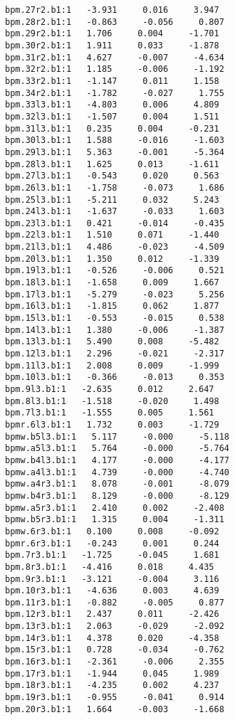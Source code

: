\begin{verbatim}
bpm.27r2.b1:1   -3.931     0.016     3.947
bpm.28r2.b1:1   -0.863     -0.056     0.807
bpm.29r2.b1:1   1.706     0.004     -1.701
bpm.30r2.b1:1   1.911     0.033     -1.878
bpm.31r2.b1:1   4.627     -0.007     -4.634
bpm.32r2.b1:1   1.185     -0.006     -1.192
bpm.33r2.b1:1   -1.147     0.011     1.158
bpm.34r2.b1:1   -1.782     -0.027     1.755
bpm.33l3.b1:1   -4.803     0.006     4.809
bpm.32l3.b1:1   -1.507     0.004     1.511
bpm.31l3.b1:1   0.235     0.004     -0.231
bpm.30l3.b1:1   1.588     -0.016     -1.603
bpm.29l3.b1:1   5.363     -0.001     -5.364
bpm.28l3.b1:1   1.625     0.013     -1.611
bpm.27l3.b1:1   -0.543     0.020     0.563
bpm.26l3.b1:1   -1.758     -0.073     1.686
bpm.25l3.b1:1   -5.211     0.032     5.243
bpm.24l3.b1:1   -1.637     -0.033     1.603
bpm.23l3.b1:1   0.421     -0.014     -0.435
bpm.22l3.b1:1   1.510     0.071     -1.440
bpm.21l3.b1:1   4.486     -0.023     -4.509
bpm.20l3.b1:1   1.350     0.012     -1.339
bpm.19l3.b1:1   -0.526     -0.006     0.521
bpm.18l3.b1:1   -1.658     0.009     1.667
bpm.17l3.b1:1   -5.279     -0.023     5.256
bpm.16l3.b1:1   -1.815     0.062     1.877
bpm.15l3.b1:1   -0.553     -0.015     0.538
bpm.14l3.b1:1   1.380     -0.006     -1.387
bpm.13l3.b1:1   5.490     0.008     -5.482
bpm.12l3.b1:1   2.296     -0.021     -2.317
bpm.11l3.b1:1   2.008     0.009     -1.999
bpm.10l3.b1:1   -0.366     -0.013     0.353
bpm.9l3.b1:1   -2.635     0.012     2.647
bpm.8l3.b1:1   -1.518     -0.020     1.498
bpm.7l3.b1:1   -1.555     0.005     1.561
bpmr.6l3.b1:1   1.732     0.003     -1.729
bpmw.b5l3.b1:1   5.117     -0.000     -5.118
bpmw.a5l3.b1:1   5.764     -0.000     -5.764
bpmw.b4l3.b1:1   4.177     -0.000     -4.177
bpmw.a4l3.b1:1   4.739     -0.000     -4.740
bpmw.a4r3.b1:1   8.078     -0.001     -8.079
bpmw.b4r3.b1:1   8.129     -0.000     -8.129
bpmw.a5r3.b1:1   2.410     0.002     -2.408
bpmw.b5r3.b1:1   1.315     0.004     -1.311
bpmw.6r3.b1:1   0.100     0.008     -0.092
bpmr.6r3.b1:1   -0.243     0.001     0.244
bpm.7r3.b1:1   -1.725     -0.045     1.681
bpm.8r3.b1:1   -4.416     0.018     4.435
bpm.9r3.b1:1   -3.121     -0.004     3.116
bpm.10r3.b1:1   -4.636     0.003     4.639
bpm.11r3.b1:1   -0.882     -0.005     0.877
bpm.12r3.b1:1   2.437     0.011     -2.426
bpm.13r3.b1:1   2.063     -0.029     -2.092
bpm.14r3.b1:1   4.378     0.020     -4.358
bpm.15r3.b1:1   0.728     -0.034     -0.762
bpm.16r3.b1:1   -2.361     -0.006     2.355
bpm.17r3.b1:1   -1.944     0.045     1.989
bpm.18r3.b1:1   -4.235     0.002     4.237
bpm.19r3.b1:1   -0.955     -0.041     0.914
bpm.20r3.b1:1   1.664     -0.003     -1.668

\end{verbatim}
